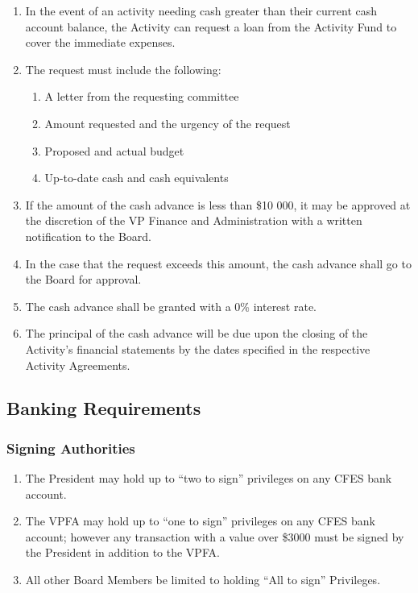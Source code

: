 \begin{enumerate}
 \item
  In the event of an activity needing cash greater than their current cash account balance, the Activity can request a loan from the Activity Fund to cover the immediate expenses.
 \item
  The request must include the following:

  \begin{enumerate}
   \item
    A letter from the requesting committee
   \item
    Amount requested and the urgency of the request
   \item
    Proposed and actual budget
   \item
    Up-to-date cash and cash equivalents
  \end{enumerate}

 \item
  If the amount of the cash advance is less than \$10 000, it may be approved at the discretion of the VP Finance and Administration with a written notification to the Board.
 \item
  In the case that the request exceeds this amount, the cash advance shall go to the Board for approval.
 \item
  The cash advance shall be granted with a 0\% interest rate.
 \item
  The principal of the cash advance will be due upon the closing of the Activity's financial statements by the dates specified in the respective Activity Agreements.
\end{enumerate}

\subsection{Banking Requirements}
\label{banking-requirements}

\subsubsection{Signing Authorities}
\label{signing-authorities}

\begin{enumerate}
 \item
  The President may hold up to “two to sign” privileges on any CFES bank account.
 \item
  The VPFA may hold up to “one to sign” privileges on any CFES bank account; however any transaction with a value over \$3000 must be signed by the President in addition to the VPFA.
 \item
  All other Board Members be limited to holding “All to sign” Privileges.
\end{enumerate}

